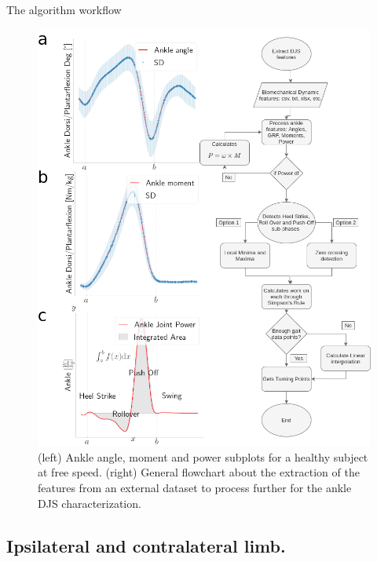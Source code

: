 \documentclass[10pt]{beamer}
\begin{document}
\begin{frame}{The algorithm workflow}

\begin{figure}
\centerline{\includegraphics[scale=0.16]{Feathergraphics/flowchart_plus_plots.png}}
\caption{\label{fig:extract_flowchart} {\scriptsize (left) Ankle angle, moment and power subplots for a healthy subject at free speed. (right) General flowchart about the extraction of the features from an external dataset to process further for the ankle DJS characterization.}}
\end{figure}
\end{frame}

\subsection{Ipsilateral and contralateral limb.}
\end{document}
